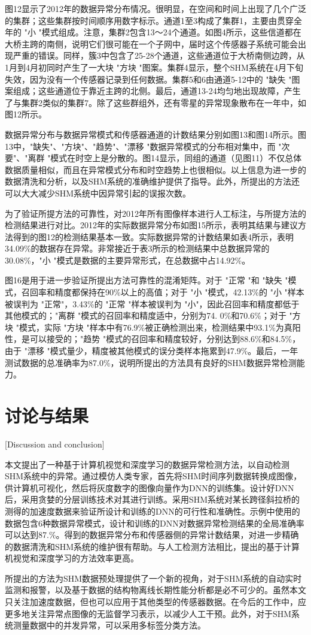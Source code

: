 图12显示了2012年的数据异常分布情况。很明显，在空间和时间上出现了几个广泛的集群；这些集群按时间顺序用数字标示。通道1至3构成了集群1，主要由贯穿全年的 "小 "模式组成。注意，集群2包含13～24个通道。如图4所示，这些信道都在大桥主跨的南侧，说明它们很可能在一个子网中，届时这个传感器子系统可能会出现严重的错误。同样，簇3中包含了25-28个通道，这些通道位于大桥南侧边跨，从1月到4月初同时产生了一大块 "方块 "图案。集群4显示，整个SHM系统在4月下旬失效，因为没有一个传感器记录到任何数据。集群5和6由通道5-12中的 "缺失 "图案组成；这些通道位于靠近主跨的北侧。最后，通道13-24均匀地出现故障，产生了与集群2类似的集群7。除了这些群组外，还有零星的异常现象散布在一年中，如图12所示。

数据异常分布与数据异常模式和传感器通道的计数结果分别如图13和图14所示。图13中，"缺失"、"方块"、"趋势"、"漂移 "数据异常模式的分布相对集中，而 "次要"、"离群 "模式在时空上是分散的。图14显示，同组的通道（见图11）不仅总体数据质量相似，而且在异常模式分布和时空趋势上也很相似。以上信息为进一步的数据清洗和分析，以及SHM系统的准确维护提供了指导。此外，所提出的方法还可以大大减少SHM系统中因异常引起的误报次数。

为了验证所提方法的可靠性，对2012年所有图像样本进行人工标注，与所提方法的检测结果进行对比。2012年的实际数据异常分布如图15所示，表明其结果与建议方法得到的图12的检测结果基本一致。实际数据异常的计数结果如表4所示，表明34.09\%的数据存在异常。非常接近于表3所示的检测结果中总数据异常的30.08\%，"小 "模式是数据的主要异常形式，在总数据中占14.92\%。

图16是用于进一步验证所提出方法可靠性的混淆矩阵。对于 "正常 "和 "缺失 "模式，召回率和精度都保持在90\%以上的高值；对于 "小 "模式，42.13\%的 "小 "样本被误判为 "正常"，3.43\%的 "正常 "样本被误判为 "小"，因此召回率和精度都低于其他模式的；"离群 "模式的召回率和精度适中，分别为74. 0\%和70.6\%；对于 "方块 "模式，实际 "方块 "样本中有76.9\%被正确检测出来，检测结果中93.1\%为真阳性，是可以接受的；"趋势 "模式的召回率和精度较好，分别达到88.6\%和84.5\%，由于 "漂移 "模式量少，精度被其他模式的误分类样本拖累到47.9\%。最后，一年测试数据的总准确率为87.0\%，说明所提出的方法具有良好的SHM数据异常检测能力。

\section{讨论与结果}[Discussion and conclusion]

本文提出了一种基于计算机视觉和深度学习的数据异常检测方法，以自动检测SHM系统中的异常。通过模仿人类专家，首先将SHM时间序列数据转换成图像，供计算机可视化，然后将灰度数字的图像向量作为DNN的训练集。设计好DNN后，采用贪婪的分层训练技术对其进行训练。采用SHM系统对某长跨径斜拉桥的测得的加速度数据来验证所设计和训练的DNN的可行性和准确性。示例中使用的数据包含6种数据异常模式，设计和训练的DNN对数据异常检测结果的全局准确率可以达到87.\%。得到的数据异常分布和传感器侧的异常计数结果，对进一步精确的数据清洗和SHM系统的维护很有帮助。与人工检测方法相比，提出的基于计算机视觉和深度学习的方法效率更高。

所提出的方法为SHM数据预处理提供了一个新的视角，对于SHM系统的自动实时监测和报警，以及基于数据的结构物离线长期性能分析都是必不可少的。虽然本文只关注加速度数据，但也可以应用于其他类型的传感器数据。在今后的工作中，应更多地关注异常点图像的无监督学习表示，以减少人工干预。此外，对于SHM系统测量数据中的并发异常，可以采用多标签分类方法。


